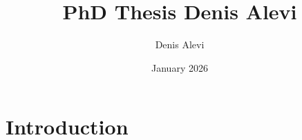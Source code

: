\documentclass{article}
\title{PhD Thesis Denis Alevi}
\author{Denis Alevi}
\date{January 2026}
\begin{document}
\maketitle

\section{Introduction}
\end{document}
